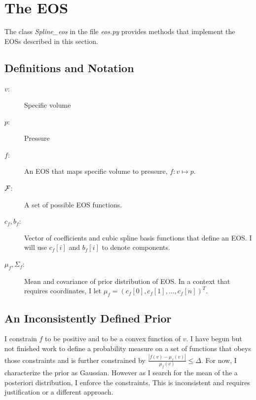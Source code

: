\documentclass[11pt]{article}
\newcommand\vol{v}        %
\newcommand{\pressure}{p}
\newcommand{\eos}{f}
\newcommand{\EOS}{{\cal F}}
\newcommand\cf{c_f}
\newcommand\fbasis{b_f}
\begin{document}
\section{The EOS}
\label{sec:eos}

The class \emph{Spline\_eos} in the file \emph{eos.py} provides
methods that implement the EOSs described in this section.

\subsection{Definitions and Notation}
\label{sec:eos-notation}

\begin{description}
\item[$\vol$:] Specific volume
\item[$\pressure$:] Pressure
\item[$\eos$:] An EOS that maps specific volume to pressure, $\eos: \vol
  \mapsto \pressure$.
\item[$\EOS$:] A set of possible EOS functions.
\item[$\cf,\fbasis$:] Vector of coefficients and cubic spline basis
  functions that define an EOS.  I will use $\cf[i]$ and $\fbasis[i]$
  to denote components.
\item[$\mu_\eos, \Sigma_\eos$:] Mean and covariance of prior
  distribution of EOS.  In a context that requires coordinates, I let
  $\mu_\eos = \left( \cf[0], \cf[1], \ldots , \cf[n] \right)^T$.
\end{description}

\subsection{An Inconsistently Defined Prior}
\label{sec:eos-prior}

I constrain $\eos$ to be positive and to be a convex function of
$\vol$.  I have begun but not finished work to define a probability
measure on a set of functions that obeys those constraints and is
further constrained by $\frac{\left| \eos(\vol) - \mu_\eos(\vol)
  \right|}{\mu_\eos(\vol)} \leq \Delta$.  For now, I characterize the
prior as Gaussian.  However as I search for the mean of the a
posteriori distribution, I enforce the constraints.  This is
inconsistent and requires justification or a different approach.
\end{document}
